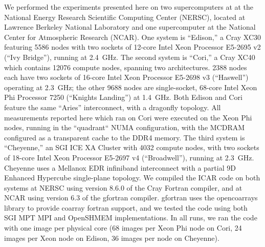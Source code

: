 We performed the experiments presented here on two supercomputers at at the National Energy Research Scientific Computing Center (NERSC),
located at Lawrence Berkeley National Laboratory and one supercomputer at the National Center for Atmospheric Research (NCAR).
One system is ``Edison,'' a Cray XC30 featuring 5586 nodes with two sockets of 12-core Intel Xeon Processor E5-2695 v2 (``Ivy Bridge''), running at \num{2.4}~\si{\giga\hertz}.
The second system is ``Cori,'' a Cray XC40 which contains \num{12076} compute nodes, spanning two architectures. \num{2388} nodes each have two sockets of 16-core Intel Xeon Processor E5-2698 v3 (``Haswell'') operating at \num{2.3}~\si{\giga\hertz}; the other \num{9688} nodes are single-socket, 68-core Intel Xeon Phi Processor 7250 (``Knights Landing'') at \num{1.4}~\si{\giga\hertz}.
Both Edison and Cori feature the same ``Aries'' interconnect, with a dragonfly topology.
All measurements reported here which ran on Cori were executed on the Xeon Phi nodes, running in the ``quadrant`` NUMA configuration, with the MCDRAM configured as a transparent cache to the DDR4 memory.
The third system is ``Cheyenne,'' an SGI ICE XA Cluster with \num{4032} compute nodes, with two sockets of 18-core Intel Xeon Processor E5-2697 v4 (``Broadwell''), running at \num{2.3}~\si{\giga\hertz}.
Cheyenne uses a Mellanox EDR infiniband interconnect with a partial 9D Enhanced Hypercube single-plane topology.
We compiled the ICAR code on both systems at NERSC using version 8.6.0 of the Cray Fortran compiler, and at NCAR using version 6.3 of the gfortran compiler.
gfortran uses the opencoarrays library to provide coarray fortran support, and we tested the code using both SGI MPT MPI and OpenSHMEM implementations.
In all runs, we ran the code with one image per physical core (68 images per Xeon Phi node on Cori, 24 images per Xeon node on Edison, 36 images per node on Cheyenne).

